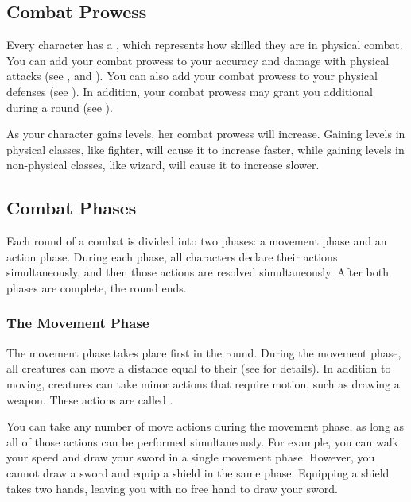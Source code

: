     \subsection{Combat Prowess}\label{Combat Prowess}
        Every character has a , which represents how skilled they are in physical combat.
        You can add your combat prowess to your accuracy and damage with physical attacks (see , and ).
        You can also add your combat prowess to your physical defenses (see ).
        In addition, your combat prowess may grant you additional  during a round (see ).

        As your character gains levels, her combat prowess will increase.
        Gaining levels in physical classes, like fighter, will cause it to increase faster, while gaining levels in non-physical classes, like wizard, will cause it to increase slower.

    \subsection{Combat Phases}

        Each round of a combat is divided into two phases: a movement phase and an action phase.
        During each phase, all characters declare their actions simultaneously, and then those actions are resolved simultaneously.
        After both phases are complete, the round ends.

        \subsubsection{The Movement Phase}\label{The Movement Phase}

            The movement phase takes place first in the round.
            During the movement phase, all creatures can move a distance equal to their  (see  for details).
            In addition to moving, creatures can take minor actions that require motion, such as drawing a weapon.
            These actions are called .

            You can take any number of move actions during the movement phase, as long as all of those actions can be performed simultaneously.
            For example, you can walk your speed and draw your sword in a single movement phase.
            However, you cannot draw a sword and equip a shield in the same phase.
            Equipping a shield takes two hands, leaving you with no free hand to draw your sword.

